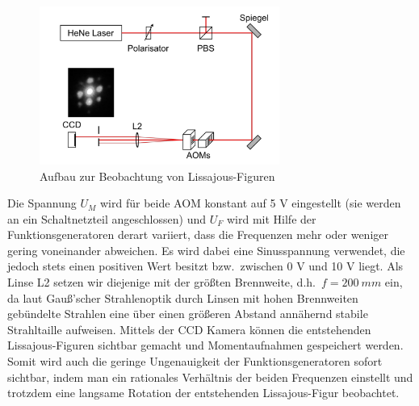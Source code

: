 \documentclass[bigchapter,colorback,accentcolor=tud4b,linedtoc,11pt]{tudreport}
\begin{document}
\begin{figure}[H] 
  \centering
     \includegraphics[width=0.7\textwidth]{img/deflektion.jpg}
  \caption[Cap for listoffigures]{Aufbau zur Beobachtung von Lissajous-Figuren \cite{Anleitung}}
\end{figure}

Die Spannung $U_M$ wird für beide AOM konstant auf 5 V eingestellt (sie werden an ein Schaltnetzteil angeschlossen) und $U_F$ wird mit Hilfe der Funktionsgeneratoren derart variiert, dass die Frequenzen mehr oder weniger gering voneinander abweichen. Es wird dabei eine Sinusspannung verwendet, die jedoch stets einen positiven Wert besitzt bzw.\ zwischen 0 V und 10 V liegt. Als Linse L2 setzen wir diejenige mit der größten Brennweite, d.h.\ $f = 200~mm$ ein, da laut Gauß'scher Strahlenoptik durch Linsen mit hohen Brennweiten gebündelte Strahlen eine über einen größeren Abstand annähernd stabile Strahltaille aufweisen. Mittels der CCD Kamera können die entstehenden Lissajous-Figuren sichtbar gemacht und Momentaufnahmen gespeichert werden. Somit wird auch die geringe Ungenauigkeit der Funktionsgeneratoren sofort sichtbar, indem man ein rationales Verhältnis der beiden Frequenzen einstellt und trotzdem eine langsame Rotation der entstehenden Lissajous-Figur beobachtet.
\end{document}
